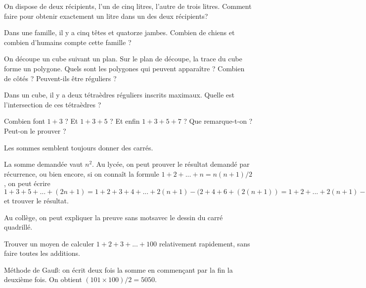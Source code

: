 \begin{exo}
On dispose de deux récipients, l'un de cinq litres, l'autre de trois litres. Comment faire pour obtenir exactement un litre dans un des deux récipients?
\end{exo}


\begin{exo}[Un système]
Dans une famille, il y a cinq têtes et quatorze jambes. Combien de chiens et combien d'humains compte cette famille ?
\end{exo}

\begin{exo}
On découpe un cube suivant un plan. Sur le plan de découpe, la trace du cube forme un polygone. Quels sont les polygones qui peuvent apparaître ? Combien de côtés ? Peuvent-ils être réguliers ?
\end{exo}

\begin{exo}[Tétraèdres]
Dans un cube, il y a deux tétraèdres réguliers inscrits maximaux. Quelle est l'intersection de ces tétraèdres ?
\end{exo}


\begin{exo}
Combien font $1+3$ ? Et $1+3+5$ ? Et enfin $1+3+5+7$ ? Que remarque-t-on ? Peut-on le prouver ?
\begin{hint}
Les sommes semblent toujours donner des carrés.
\end{hint}
\begin{sol}
La somme demandée vaut $n^2$.
Au lycée, on peut prouver le résultat demandé par récurrence, ou bien encore, si on connaît la formule $1+2+...+n = n(n+1)/2$, on peut écrire $1+3+5+...+(2n+1) = 1+2+3+4+...+2(n+1) -(2+4+6+(2(n+1)) = 1+2+...+2(n+1) -2(1+2+...+(n+1))$ et trouver le résultat.

Au collège, on peut expliquer la \og preuve sans mots\fg avec le dessin du carré quadrillé.
\end{sol}
\end{exo}

\begin{exo}
Trouver un moyen de calculer $1+2+3+...+100$ relativement rapidement, sans faire toutes les additions.

\begin{sol}
Méthode de Gau\ss : on écrit deux fois la somme en commençant par la fin la deuxième fois. On obtient $(101\times 100)/2 = 5050$.
\end{sol}
\end{exo}

